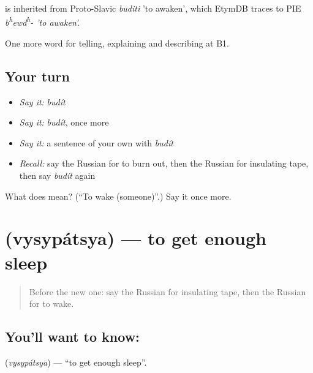 \begin{cousinweb}
\emph{} is inherited from Proto-Slavic \emph{buditi} 'to awaken', which EtymDB traces to PIE \emph{b\textsuperscript{h}ewd\textsuperscript{h}- 'to awaken'.}
\end{cousinweb}

\begin{grammarlens}[title={What you've built}]
One more word for telling, explaining and describing at B1.
\end{grammarlens}

\subsection*{Your turn}
\begin{itemize}
\raggedright
  \item \emph{Say it:} \emph{budít}
  \item \emph{Say it:} \emph{budít}, once more
  \item \emph{Say it:} a sentence of your own with \emph{budít}
  \item \emph{Recall:} say the Russian for to burn out, then the Russian for insulating tape, then say \emph{budít} again
\end{itemize}

\begin{tcolorbox}[breakable,colback=teal!4,colframe=teal!35!black,title={Before you move on}]
What does  mean? (\textquotedblleft{}To wake (someone)\textquotedblright{}.) Say it once more.
\end{tcolorbox}
\section[\texorpdfstring{\ru{высыпаться} (vysypátsya)}{высыпаться (vysypátsya)}]{ (vysypátsya) — to get enough sleep}

\label{lesson:RU-C534-vysypatsya}



\begin{quote}
Before the new one: say the Russian for insulating tape, then the Russian for to wake.
\end{quote}

\subsection*{You'll want to know: }
\textbf{} (\emph{vysypátsya}) — \textquotedblleft{}to get enough sleep\textquotedblright{}.

